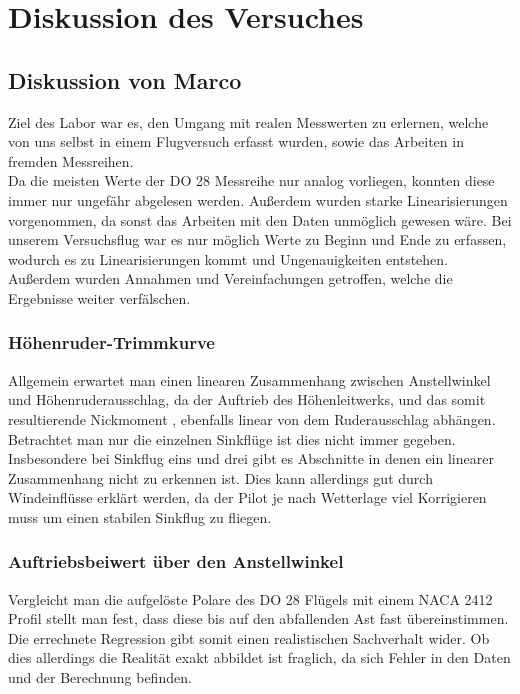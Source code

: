 \chapter{Diskussion des Versuches}
\label{chapter:fazit}
\section{Diskussion von Marco}
Ziel des Labor war es, den Umgang mit realen Messwerten zu erlernen, welche von uns selbst in einem Flugversuch erfasst wurden, sowie das Arbeiten in fremden Messreihen.\\ Da die meisten Werte der DO 28 Messreihe nur analog vorliegen, konnten diese immer nur ungefähr abgelesen werden. Außerdem wurden starke Linearisierungen vorgenommen, da sonst das Arbeiten mit den Daten unmöglich gewesen wäre. Bei unserem Versuchsflug war es nur möglich Werte zu Beginn und Ende zu erfassen, wodurch es zu Linearisierungen kommt und Ungenauigkeiten entstehen. Außerdem wurden  Annahmen und Vereinfachungen getroffen, welche die Ergebnisse weiter verfälschen.
\subsection{Höhenruder-Trimmkurve}
Allgemein erwartet man einen linearen Zusammenhang zwischen Anstellwinkel und Höhenruderausschlag, da der Auftrieb des Höhenleitwerks, und das somit resultierende Nickmoment , ebenfalls linear von dem Ruderausschlag abhängen. \\ Betrachtet man nur die einzelnen Sinkflüge ist dies nicht immer gegeben. Insbesondere bei Sinkflug eins und drei gibt es Abschnitte in denen ein linearer Zusammenhang nicht zu erkennen ist. Dies kann allerdings gut durch Windeinflüsse erklärt werden, da der Pilot je nach Wetterlage viel Korrigieren muss um einen stabilen Sinkflug zu fliegen.
\subsection{Auftriebsbeiwert über den Anstellwinkel} Vergleicht man die aufgelöste Polare des DO 28 Flügels mit einem NACA 2412 Profil stellt man fest, dass diese bis auf den abfallenden Ast fast übereinstimmen. Die errechnete Regression gibt somit einen realistischen Sachverhalt wider. Ob dies allerdings die Realität exakt abbildet ist fraglich, da sich Fehler in den Daten und der Berechnung befinden.
